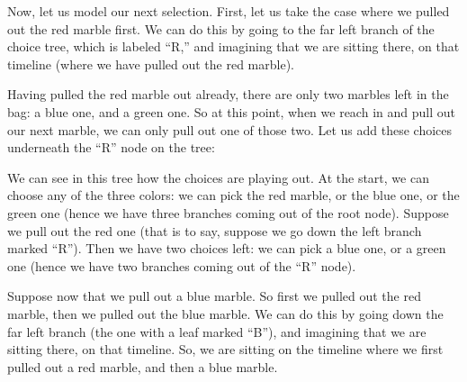 \documentclass[../../../main.tex]{subfiles}
\begin{document}
\noindent
Now, let us model our next selection. First, let us take the case where we pulled out the red marble first. We can do this by going to the far left branch of the choice tree, which is labeled ``R,'' and imagining that we are sitting there, on that timeline (where we have pulled out the red marble). 

Having pulled the red marble out already, there are only two marbles left in the bag: a blue one, and a green one. So at this point, when we reach in and pull out our next marble, we can only pull out one of those two. Let us add these choices underneath the ``R'' node on the tree:

\begin{center}
\end{center}

\noindent
We can see in this tree how the choices are playing out. At the start, we can choose any of the three colors: we can pick the red marble, or the blue one, or the green one (hence we have three branches coming out of the root node). Suppose we pull out the red one (that is to say, suppose we go down the left branch marked ``R''). Then we have two choices left: we can pick a blue one, or a green one (hence we have two branches coming out of the ``R'' node).

Suppose now that we pull out a blue marble. So first we pulled out the red marble, then we pulled out the blue marble. We can do this by going down the far left branch (the one with a leaf marked ``B''), and imagining that we are sitting there, on that timeline. So, we are sitting on the timeline where we first pulled out a red marble, and then a blue marble. 
\end{document}
